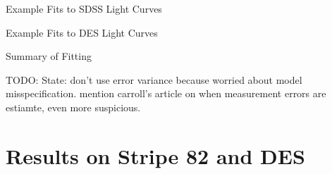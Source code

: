 \documentclass[12pt]{beamer}
\newcommand{\todo}[1]{{\color{red}TODO: #1}}
\begin{document}
\begin{frame}{Example Fits to SDSS Light Curves}

\end{frame}

\begin{frame}{Example Fits to DES Light Curves}

\end{frame}

\begin{frame}{Summary of Fitting}

  \todo{State: don't use error variance because worried about model misspecification. mention carroll's article on when measurement errors are estiamte, even more suspicious.} 
  
\end{frame}





\section{Results on Stripe 82 and DES}
\end{document}
